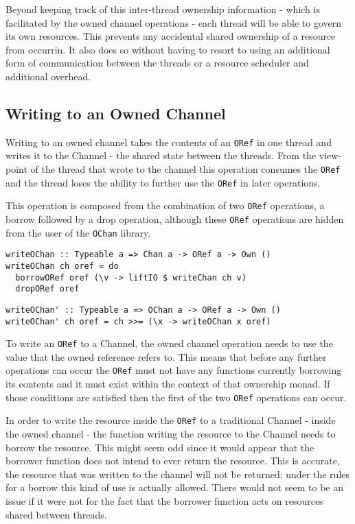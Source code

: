 \documentclass[onehalf,11pt]{beavtex}
\begin{document}
Beyond keeping track of this inter-thread ownership information - which is
facilitated by the owned channel operations - each thread will be able
to govern its own resources.  This prevents any accidental shared ownership of
a resource from occurrin. It also does so without having to resort to using an
additional form of communication between the threads or a resource scheduler and
additional overhead. 

\subsection{Writing to an Owned Channel}

Writing to an owned channel takes the contents of an \texttt{ORef} in
one thread and writes it to the Channel - the shared state between the threads.
From the view-point of the thread that wrote to the channel this operation
consumes the \texttt{ORef} and the thread loses the ability to further use the
\texttt{ORef} in later operations.

This operation is composed from the combination of two
\texttt{ORef} operations, a borrow followed by a drop operation, 
although these \texttt{ORef} operations are hidden from the user of the
\texttt{OChan} library.

\begin{verbatim}
writeOChan :: Typeable a => Chan a -> ORef a -> Own ()
writeOChan ch oref = do
  borrowORef oref (\v -> liftIO $ writeChan ch v)
  dropORef oref
\end{verbatim}

\begin{verbatim}
writeOChan' :: Typeable a => OChan a -> ORef a -> Own ()
writeOChan' ch oref = ch >>= (\x -> writeOChan x oref)
\end{verbatim}

To write an \texttt{ORef} to a Channel, the owned channel operation
needs to use the value that the owned reference refers to.  This means
that before any further operations can occur the \texttt{ORef} must not have any
functions currently borrowing its contents and it must exist within the context
of that ownership monad.
If those conditions are satisfied then the first of the two \texttt{ORef}
operations can occur.

In order to write the resource inside the \texttt{ORef} to a traditional Channel
- inside the owned channel - the function writing the resource to the
Channel needs to borrow the resource.
This might seem odd since it would appear that the borrower function does not
intend to ever return the resource.  This is accurate, the resource that was
written to the channel will not be returned; under the rules for a
borrow this kind of use is actually allowed.
There would not seem to be an issue if it were not for the fact that
the borrower function acts on resources shared between threads.
\end{document}
